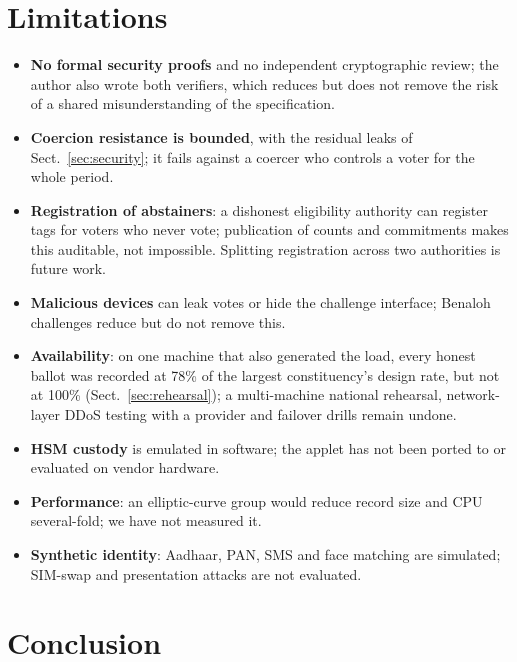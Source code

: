 \documentclass[runningheads]{llncs}
\begin{document}
\section{Limitations}\label{sec:limits}

\begin{itemize}
\item \textbf{No formal security proofs} and no independent cryptographic review; the author also wrote both verifiers, which reduces but does not remove the risk of a shared misunderstanding of the specification.
\item \textbf{Coercion resistance is bounded}, with the residual leaks of Sect.~\ref{sec:security}; it fails against a coercer who controls a voter for the whole period.
\item \textbf{Registration of abstainers}: a dishonest eligibility authority can register tags for voters who never vote; publication of counts and commitments makes this auditable, not impossible. Splitting registration across two authorities is future work.
\item \textbf{Malicious devices} can leak votes or hide the challenge interface; Benaloh challenges reduce but do not remove this.
\item \textbf{Availability}: on one machine that also generated the load, every honest ballot was recorded at 78\% of the largest constituency's design rate, but not at 100\% (Sect.~\ref{sec:rehearsal}); a multi-machine national rehearsal, network-layer DDoS testing with a provider and failover drills remain undone.
\item \textbf{HSM custody} is emulated in software; the applet has not been ported to or evaluated on vendor hardware.
\item \textbf{Performance}: an elliptic-curve group would reduce record size and CPU several-fold; we have not measured it.
\item \textbf{Synthetic identity}: Aadhaar, PAN, SMS and face matching are simulated; SIM-swap and presentation attacks are not evaluated.
\end{itemize}

\section{Conclusion}
\end{document}
